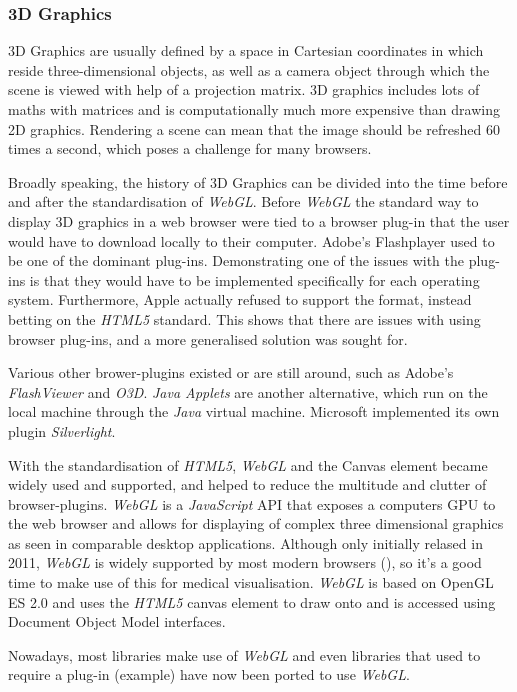 \documentclass[a4paper,11pt,titlepage]{article}
\begin{document}
\subsubsection{3D Graphics}

3D Graphics are usually defined by a space in Cartesian coordinates in which reside three-dimensional objects, as well as a camera object through which the scene is viewed with help of a projection matrix. 3D graphics includes lots of maths with matrices and is computationally much more expensive than drawing 2D graphics. Rendering a scene can mean that the image should be refreshed 60 times a second, which poses a challenge for many browsers.

Broadly speaking, the history of 3D Graphics can be divided into the time before and after the standardisation of \textit{WebGL}. Before \textit{WebGL} the standard way to display 3D graphics in a web browser were tied to a browser plug-in that the user would have to download locally to their computer. Adobe's Flashplayer used to be one of the dominant plug-ins. Demonstrating one of the issues with the plug-ins is that they would have to be implemented specifically for each operating system. Furthermore, Apple actually refused to support the format, instead betting on the \textit{HTML5} standard. This shows that there are issues with using browser plug-ins, and a more generalised solution was sought for.

Various other brower-plugins existed or are still around, such as Adobe's \textit{FlashViewer} and \textit{O3D}. \textit{Java Applets} are another alternative, which run on the local machine through the \textit{Java} virtual machine. Microsoft implemented its own plugin \textit{Silverlight}.

With the standardisation of \textit{HTML5}, \textit{WebGL} and the Canvas element became widely used and supported, and helped to reduce the multitude and clutter of browser-plugins. \textit{WebGL} is a \textit{JavaScript} API that exposes a computers GPU to the web browser and allows for displaying of complex three dimensional graphics as seen in comparable desktop applications. Although only initially relased in 2011, \textit{WebGL} is widely supported by most modern browsers (\cite{webGL}), so it's a good time to make use of this for medical visualisation. \textit{WebGL} is based on OpenGL ES 2.0 and uses the \textit{HTML5} canvas element to draw onto and is accessed using Document Object Model interfaces.

Nowadays, most libraries make use of \textit{WebGL} and even libraries that used to require a plug-in (example) have now been ported to use \textit{WebGL}. 
\end{document}
